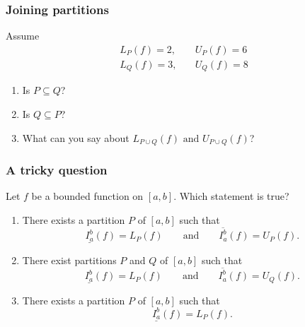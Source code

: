 \documentclass[14pt]{beamer}
\newcommand {\DS} [1] {${\displaystyle #1}$}
\newcommand{\p}{\pause}
\newcommand{\setsize}[1]{\fontsize{#1}{#1}\selectfont} %
\newcommand{\smallerfont}{\setsize{13}} %
\newcommand{\lifab}{\underline{I_a^b}(f)}
\newcommand{\uifab}{\overline{I_a^b}(f)}
\newcommand{\puntos}[2]{
	\draw[thick] (-5,0) to (5,0);
		
	\draw[decorate, decoration={brace, amplitude=10pt}, yshift=10pt] (#1-3.5,-0) -- (#1-0,-0) 
		node [red,midway,yshift=20pt]{lower sums};
	
	\draw[red, fill] (#1-2.5,0) circle [radius=0.1] ;
	\draw[red, fill] (#1-3.3,0) circle [radius=0.1] ;
	\draw[red, fill] (#1-2.0,0) circle [radius=0.1] ;
	\draw[red, fill] (#1-1.8,0) circle [radius=0.1] ;
	\draw[red, fill] (#1-1.3,0) circle [radius=0.1] ;
	\draw[red, fill] (#1-0.8,0) circle [radius=0.1] ;
	\draw[red, fill] (#1-0.5,0) circle [radius=0.1] ;
	\draw[red, fill] (#1-0.2,0) circle [radius=0.1] ;
	\draw[red, fill] (#1-0.05,0) circle [radius=0.1] ;

	\draw[decorate, decoration={brace, amplitude=10pt}, yshift=10pt] (#2+0,0) -- (#2+3.5,0) 
		node [verde,midway,yshift=20pt]{upper sums};
		
	\draw[verde, fill] (#2+2.7,0) circle [radius=0.1] ;
	\draw[verde, fill] (#2+3.1,0) circle [radius=0.1] ;
	\draw[verde, fill] (#2+1.8,0) circle [radius=0.1] ;
	\draw[verde, fill] (#2+1.5,0) circle [radius=0.1] ;
	\draw[verde, fill] (#2+1.2,0) circle [radius=0.1] ;
	\draw[verde, fill] (#2+0.7,0) circle [radius=0.1] ;
	\draw[verde, fill] (#2+0.4,0) circle [radius=0.1] ;
	\draw[verde, fill] (#2+0.2,0) circle [radius=0.1] ;
	\draw[verde, fill] (#2+0.03,0) circle [radius=0.1] ;
}
\begin{document}
\begin{frame}[t]
\frametitle{Joining partitions}

Assume 
\begin{align*}
 L_P(f)=2, & \quad U_P(f)=6 \\
 L_Q(f)=3, & \quad U_Q(f)=8 
\end{align*}


\begin{enumerate}
\item Is \DS{P \subseteq Q}?
\item Is \DS{Q \subseteq P}?
\item  What can you say about 
\DS{L_{P \cup Q}(f) \mbox{ and } U_{P \cup Q}(f) }?
\end{enumerate}

\end{frame}
\begin{frame}[t]
\smallerfont
\frametitle{A tricky question}

Let $f$ be a bounded function on $[a,b]$.  Which statement is true?

\begin{enumerate}
\item  There exists a partition $P$ of $[a,b]$ such that   
	$$ \lifab=L_P(f) \quad \quad \mbox{and} \quad \quad \uifab=U_P(f).$$
\item  There exist  partitions $P$ and $Q$ of $[a,b]$ such that   
	$$ \lifab=L_P(f) \quad \quad \mbox{and} \quad \quad \uifab=U_Q(f).$$
\p
\item  There exists a partition $P$ of $[a,b]$ such that   
	$$ \lifab=L_P(f).$$
\end{enumerate}

\begin{center}
\end{center}

\end{frame}
\end{document}
